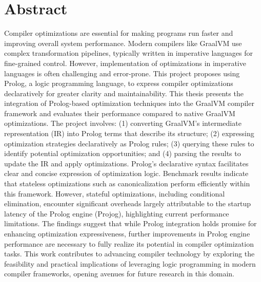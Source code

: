 \section*{Abstract}

\noindent
Compiler optimizations are essential for making programs run faster and improving overall system performance. 
Modern compilers like GraalVM use complex transformation pipelines, typically written in imperative languages for fine-grained control. However, implementation of optimizations in imperative languages is often challenging and error-prone. 
This project proposes using Prolog, a logic programming language, to express compiler optimizations declaratively for greater clarity and maintainability.
This thesis presents the integration of Prolog-based optimization techniques into the GraalVM compiler framework and evaluates their performance compared to native GraalVM optimizations. The project involves: (1) converting GraalVM’s intermediate representation (IR) into Prolog terms that describe its structure; (2) expressing optimization strategies declaratively as Prolog rules; (3) querying these rules to identify potential optimization opportunities; and (4) parsing the results to update the IR and apply optimizations.
Prolog’s declarative syntax facilitates clear and concise expression of optimization logic. Benchmark results indicate that stateless optimizations such as canonicalization perform efficiently within this framework. However, stateful optimizations, including conditional elimination, encounter significant overheads largely attributable to the startup latency of the Prolog engine (Projog), highlighting current performance limitations. The findings suggest that while Prolog integration holds promise for enhancing optimization expressiveness, further improvements in Prolog engine performance are necessary to fully realize its potential in compiler optimization tasks.
This work contributes to advancing compiler technology by exploring the feasibility and practical implications of leveraging logic programming in modern compiler frameworks, opening avenues for future research in this domain.
